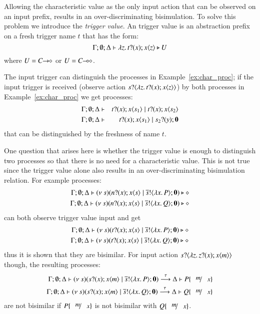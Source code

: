 Allowing the characteristic value as the only input action
that can be observed on an input prefix,
results in an over-discriminating bisimulation.
To solve this problem we introduce the {\em trigger value}.
An trigger value is an abstraction 
prefix on a fresh trigger name $t$ that has the form:
\[
	\Gamma; \emptyset; \Delta \vdash \lambda z.\,t ? (x) ; x\langle z \rangle \triangleright U
\]
where $U = C\!\! \rightarrow\!\! \diamond$ or $U = C\!\! \multimap\!\! \diamond$.

The input trigger can distinguish the processes in Example~\ref{ex:char_proc};
if the input trigger is received (observe action $s ? \langle \lambda z.\,t ? (x) ; x\langle z \rangle \rangle$)
by both processes in Example~\ref{ex:char_proc} we get processes:
%
\begin{eqnarray*}
	\Gamma; \emptyset; \Delta &\vdash& t ? (x) ; x\langle s_1 \rangle \;|\; t ? (x) ; x\langle s_2 \rangle
	\\
	\Gamma; \emptyset; \Delta &\vdash& t ? (x) ; x\langle s_1 \rangle \;|\; s_2 ? (y) ; \mathbf{0}
\end{eqnarray*}
%
\noi that can be distinguished by the freshness of name $t$.

One question that arises here is whether the trigger value is enough
to distinguish two processes so that there is no need for a
characteristic value. This is not true since the trigger value
alone also results in an over-discriminating bisimulation relation.
For example processes:
%
\begin{eqnarray*}
	\Gamma; \emptyset; \Delta \vdash (\nu\ s)(n ? (x) ; x\langle s \rangle \;|\; \overline{s} ! \langle \lambda x.\,P \rangle ; \mathbf{0}) \triangleright \diamond
	\\
	\Gamma; \emptyset; \Delta \vdash (\nu\ s)(n ? (x) ; x\langle s \rangle \;|\; \overline{s} ! \langle \lambda x.\,Q \rangle ; \mathbf{0}) \triangleright \diamond
\end{eqnarray*}
%
\noi can both observe trigger value input and get
%
\begin{eqnarray*}
	\Gamma; \emptyset; \Delta \vdash (\nu\ s)(t ? (x) ; x\langle s \rangle \;|\; \overline{s} ! \langle \lambda x.\,P \rangle ; \mathbf{0}) \triangleright \diamond
	\\
	\Gamma; \emptyset; \Delta \vdash (\nu\ s)(t ? (x) ; x\langle s \rangle \;|\; \overline{s} ! \langle \lambda x.\,Q \rangle ; \mathbf{0}) \triangleright \diamond
\end{eqnarray*}
%
\noi thus it is shown that they are bisimilar.
For input action $s ? \langle \lambda z.\,z ? (x) ; x\langle m \rangle \rangle$
though, the resulting processes:
\begin{eqnarray*}
	\Gamma; \es; \Delta \proves \newsp{s}{\binp{s}{x} \appl{x}{m} \Par \bout{\dual{s}}{\abs{x} P} \inact} \by{\tau} \Delta \proves P \subst{m}{x}
	\\
	\Gamma; \es; \Delta \proves \newsp{s}{\binp{s}{x} \appl{x}{m} \Par \bout{\dual{s}}{\abs{x} Q} \inact} \by{\tau} \Delta \proves Q \subst{m}{x}
\end{eqnarray*}
\noi are not bisimilar if $P \subst{m}{x}$ is not bisimilar with $Q \subst{m}{x}$.

